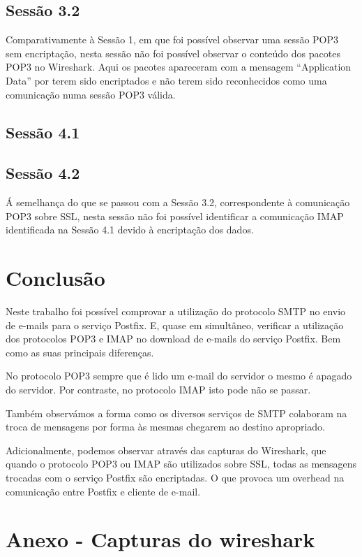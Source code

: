 \documentclass[a4paper,12pt]{article}
\begin{document}
\subsection{Sessão 3.2}

Comparativamente à Sessão 1, em que foi possível observar uma sessão POP3 sem
encriptação, nesta sessão não foi possível observar o conteúdo dos pacotes POP3
no Wireshark. Aqui os pacotes apareceram com a mensagem ``Application
Data'' por terem sido encriptados e não terem sido reconhecidos como
uma comunicação numa sessão POP3 válida.

\subsection{Sessão 4.1}



\subsection{Sessão 4.2}

Á semelhança do que se passou com a Sessão 3.2, correspondente à comunicação
POP3 sobre SSL, nesta sessão não foi possível identificar a comunicação IMAP
identificada na Sessão 4.1 devido à encriptação dos dados.

\section{Conclusão}

Neste trabalho foi possível comprovar a utilização do protocolo SMTP no 
envio de e-mails para o serviço Postfix. E, quase em simultâneo, verificar 
a utilização dos protocolos POP3 e IMAP no download de e-mails do 
serviço Postfix. Bem como as suas principais diferenças.

No protocolo POP3 sempre que é lido um e-mail do servidor o mesmo é
apagado do servidor. Por contraste, no protocolo IMAP isto pode não se passar.

Também observámos a forma como os diversos serviços de SMTP colaboram na
troca de mensagens por forma às mesmas chegarem ao destino apropriado.

Adicionalmente, podemos observar através das capturas do Wireshark, que
quando o protocolo POP3 ou IMAP são utilizados sobre SSL, todas as
mensagens trocadas com o serviço Postfix são encriptadas. O que provoca
um overhead na comunicação entre Postfix e cliente de e-mail.

\section{Anexo - Capturas do wireshark}
\end{document}
